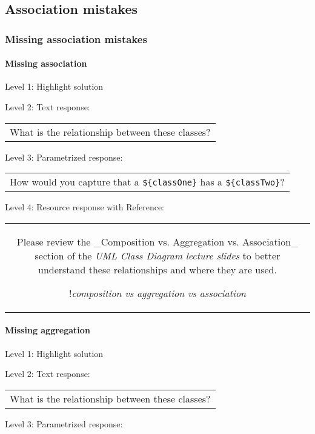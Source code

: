 \subsection{Association mistakes}

\subsubsection{Missing association mistakes}

\paragraph{Missing association}

\noindent Level 1: Highlight solution \medskip

\noindent Level 2: Text response: \medskip

\begin{tabular}{|c}
What is the relationship between these classes?
\end{tabular} \medskip

\noindent Level 3: Parametrized response: \medskip

\begin{tabular}{|c}
How would you capture that a \verb|${classOne}| has a \verb|${classTwo}|?
\end{tabular} \medskip

\noindent Level 4: Resource response with Reference:

\begin{tabular}{|c}
Please review the _Composition vs. Aggregation vs. Association_ section of 
the \textit{UML Class Diagram lecture slides} to 
better understand these relationships and where they are used.

!\textit{composition vs aggregation vs association}
\end{tabular} \medskip


\paragraph{Missing aggregation}

\noindent Level 1: Highlight solution \medskip

\noindent Level 2: Text response: \medskip

\begin{tabular}{|c}
What is the relationship between these classes?
\end{tabular} \medskip

\noindent Level 3: Parametrized response: \medskip

